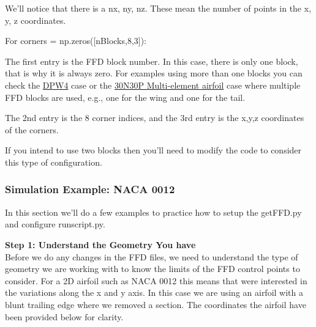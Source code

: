 \documentclass[12pt]{article}
\begin{document}
\noindent We'll notice that there is a nx, ny, nz. These mean the number of points in the x, y, z coordinates.\vspace{4mm}

\noindent For corners = np.zeros([nBlocks,8,3]):\vspace{4mm} 

\noindent The first entry is the FFD block number. In this case, there is only one block, that is why it is always zero. For examples using more than one blocks you can check the \href{https://dafoam.github.io/mydoc_tutorials_aero_dpw4.html}{DPW4} case or the \href{https://dafoam.github.io/mydoc_tutorials_aero_30n30p.html}{30N30P Multi-element airfoil} case where multiple FFD blocks are used, e.g., one for the wing and one for the tail.\vspace{4mm} 

\noindent The 2nd entry is the 8 corner indices, and the 3rd entry is the x,y,z coordinates of the corners.\vspace{4mm} 

\noindent If you intend to use two blocks then you'll need to modify the code to consider this type of configuration.
    
\subsubsection{Simulation Example: NACA 0012}

In this section we'll do a few examples to practice how to setup the getFFD.py and configure runscript.py. \vspace{4mm} 

\noindent \textbf{Step 1: Understand the Geometry You have}\\
\noindent Before we do any changes in the FFD files, we need to understand the type of geometry we are working with to know the limits of the FFD control points to consider. For a 2D airfoil such as NACA 0012 this means that were interested in the variations along the x and y axis. In this case we are using an airfoil with a blunt trailing edge where we removed a section. The coordinates the airfoil have been provided below for clarity. 
\end{document}
